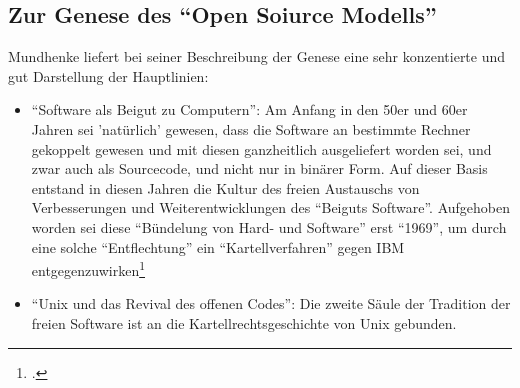 \documentclass[DIV=calc,BCOR=5mm,11pt,headings=small,oneside,abstract=true, toc=bib]{scrartcl}
\begin{document}
\subsection{Zur Genese des \enquote{Open Soiurce Modells}}

Mundhenke liefert bei seiner Beschreibung der Genese eine sehr konzentierte und
gut Darstellung der Hauptlinien:

\begin{itemize}
  \item \enquote{Software als Beigut zu Computern}: Am Anfang in den 50er
  und 60er Jahren sei 'natürlich' gewesen, dass die Software an bestimmte
  Rechner gekoppelt gewesen und mit diesen ganzheitlich ausgeliefert worden sei,
  und zwar auch als Sourcecode, und nicht nur in binärer Form. Auf dieser Basis
  entstand in diesen Jahren die Kultur des freien Austauschs von Verbesserungen
  und Weiterentwicklungen des \enquote{Beiguts Software}. Aufgehoben worden
  sei diese \enquote{Bündelung von Hard- und Software} erst
  \enquote{1969}, um durch eine solche \enquote{Entflechtung} ein
  \enquote{Kartellverfahren} gegen IBM
  entgegenzuwirken\footcite[vgl.][50]{Mundhenke2007a}
  \item \enquote{Unix und das Revival des offenen Codes}: Die zweite Säule
  der Tradition der freien Software ist an die Kartellrechtsgeschichte von Unix
  gebunden.
\end{itemize}

\small

\end{document}
